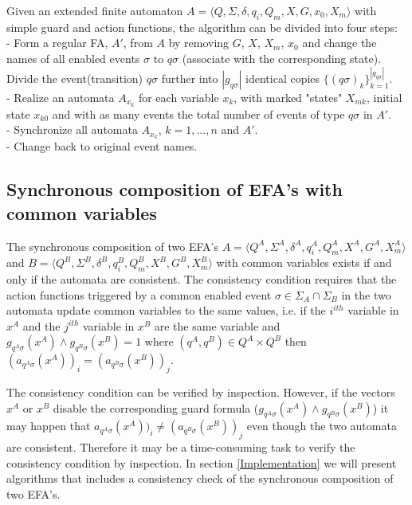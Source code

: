 \documentclass{article}
\begin{document}
Given an extended finite automaton $A=\langle Q, \Sigma, \delta,
q_i, Q_m, X, G ,x_0, X_m \rangle$ with simple guard and action
functions, the algorithm can be divided into four steps:\\
- Form a regular FA, $A'$, from $A$ by removing $G$, $X$, $X_m$,
$x_0$ and change the names of all enabled events $\sigma$ to
$q\sigma$ (associate with the corresponding
state). Divide the event(transition) $q\sigma$ further into $|g_{q \sigma}|$ identical copies $\{(q\sigma)_k\}^{|g_{q \sigma}|}_{k=1}$.\\
- Realize an automata $A_{x_k}$ for each variable $x_k$, with
marked "states" $X_{mk}$,
 initial state $x_{k 0}$ and with as many events the total number of events of type $q\sigma$ in $A'$.\\
- Synchronize all automata $A_{x_k}$, $k=1,...,n$ and $A'$.\\
- Change back to original event names.
\newpage
\subsection{Synchronous composition of EFA's with common variables}

The synchronous composition of two EFA's $A=\langle Q^A, \Sigma^A,
\delta^A, q^A_i, Q^A_m, X^{A}, G^A, X^A_m \rangle$ and $B=\langle
Q^B, \Sigma^B, \delta^B, q^B_i, Q^B_m, X^{B}, G^B, X^B_m \rangle$
with common variables exists if and only if the automata are
consistent. The consistency condition requires that the action
functions triggered by a common enabled event $\sigma\in
\Sigma_{A}\cap \Sigma_{B}$ in the two automata update common
variables to the same values, i.e. if the $i^{ith}$ variable in
$x^{A}$ and the $j^{ith}$ variable in $x^{B}$ are the same
variable and $g_{q^A \sigma}(x^{A})\wedge g_{q^B \sigma}(x^{B})=1$
where $(q^A,q^B)\in Q^A\times Q^B$ then $(a_{q^A \sigma}(x^{A}))_i
= (a_{q^B \sigma}(x^{B}))_j$.

The consistency condition can be verified by inspection. However,
if the vectors $x^{A}$ or $x^{B}$ disable the corresponding guard
formula ($g_{q^A \sigma}(x^{A})\wedge g_{q^B \sigma}(x^{B})$) it
may happen that $a_{q^A \sigma}(x^{A}))_i \neq (a_{q^B
\sigma}(x^{B}))_j$ even though the two automata are consistent.
Therefore it may be a time-consuming task to verify the
consistency condition by inspection. In section
\ref{Implementation} we will present algorithms that includes a
consistency check of the synchronous
composition of two EFA's. \\
\end{document}
